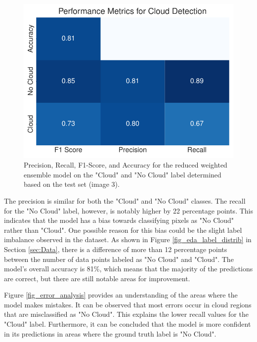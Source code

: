 \documentclass[11pt,letterpaper]{article}
\begin{document}
\begin{figure}[H]
    \centering
    \includegraphics[width=0.9\linewidth]{figs/post_hoc_eda.pdf}
    \caption{Precision, Recall, F1-Score, and Accuracy for the reduced weighted ensemble model on the "Cloud" and "No Cloud" label determined based on the test set (image 3).}
    \label{fig_classification_metrics}
\end{figure}

The precision is similar for both the "Cloud" and "No Cloud" classes. The recall for the "No Cloud" label, however, is notably higher by 22 percentage points. This indicates that the model has a bias towards classifying pixels as "No Cloud" rather than "Cloud". One possible reason for this bias could be the slight label imbalance observed in the dataset. As shown in Figure \ref{fig_eda_label_distrib} in Section \ref{sec:Data}, there is a difference of more than 12 percentage points between the number of data points labeled as "No Cloud" and "Cloud". The model's overall accuracy is 81\%, which means that the majority of the predictions are correct, but there are still notable areas for improvement.

Figure \ref{fig_error_analysis} provides an understanding of the areas where the model makes mistakes. It can be observed that most errors occur in cloud regions that are misclassified as "No Cloud". This explains the lower recall values for the "Cloud" label. Furthermore, it can be concluded that the model is more confident in its predictions in areas where the ground truth label is "No Cloud".
\end{document}
